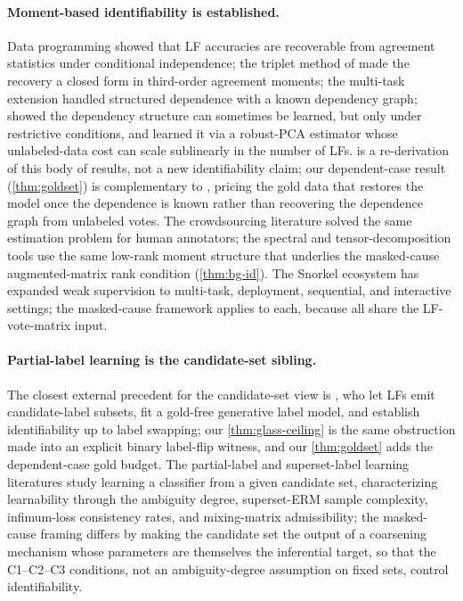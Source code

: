 \paragraph{Moment-based identifiability is established.} Data
programming \citep{ratner2016data} showed that LF accuracies are
recoverable from agreement statistics under conditional independence;
the triplet method of \citet{fu2020fast} made the recovery a
closed form in third-order agreement moments; the multi-task
extension \citep{ratner2019training,ratner2020training} handled
structured dependence with a known dependency graph;
\citet{bach2017learning} showed the dependency structure can
sometimes be learned, but only under restrictive conditions, and
\citet{varma2019dependency} learned it via a robust-PCA estimator
whose unlabeled-data cost can scale sublinearly in the number of LFs.
 is a re-derivation of this body of
results, not a new identifiability claim; our dependent-case result
(\cref{thm:goldset}) is complementary to \citet{varma2019dependency},
pricing the gold data that restores the model once the dependence is
known rather than recovering the dependence graph from unlabeled votes. The crowdsourcing
literature \citep{karger2011iterative,zhang2016spectral} solved the
same estimation problem for human annotators; the spectral and
tensor-decomposition tools \citep{anandkumar2014tensor} use the
same low-rank moment structure that underlies the masked-cause
augmented-matrix rank condition (\cref{thm:bg-id}). The Snorkel
ecosystem \citep{ratner2018snorkelmetal,bach2019snorkeldrybell,
sala2019multiresolution,zhang2022survey} has expanded weak
supervision to multi-task, deployment, sequential, and interactive
\citep{boecking2021interactive} settings; the masked-cause framework
applies to each, because all share the LF-vote-matrix input.

\paragraph{Partial-label learning is the candidate-set sibling.} The
closest external precedent for the candidate-set view is
\citet{yu2022nplm}, who let LFs emit candidate-label subsets, fit a
gold-free generative label model, and establish identifiability up to
label swapping; our \cref{thm:glass-ceiling} is the same obstruction
made into an explicit binary label-flip witness, and our
\cref{thm:goldset} adds the dependent-case gold budget. The
partial-label and superset-label learning literatures
\citep{cour2011partial,liu2014superset,cabannes2020infimum,
cidsueiro2012proper} study learning a classifier from a given
candidate set, characterizing learnability through the ambiguity
degree, superset-ERM sample complexity, infimum-loss consistency
rates, and mixing-matrix admissibility; the masked-cause framing
differs by making the candidate set the output of a coarsening
mechanism whose parameters are themselves the inferential target, so
that the C1--C2--C3 conditions, not an ambiguity-degree assumption on
fixed sets, control identifiability.

